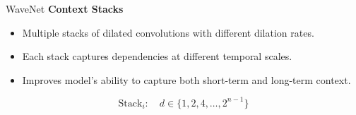 \begin{frame}[allowframebreaks]{WaveNet}
    \textbf{Context Stacks}

    \begin{itemize}
        \item Multiple stacks of dilated convolutions with different dilation rates.
        \item Each stack captures dependencies at different temporal scales.
        \item Improves model's ability to capture both short-term and long-term context.
    \end{itemize}
    \begin{equation*}
        \text{Stack}_i: \quad d \in \{1, 2, 4, \ldots, 2^{n-1}\}
    \end{equation*}

    \framebreak


\end{frame}
